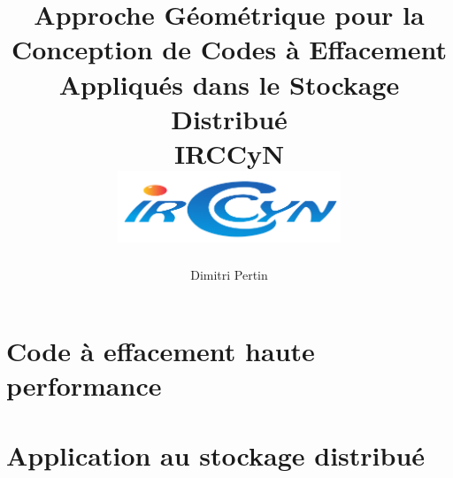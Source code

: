 
\makeindex



\title{
    {Approche Géométrique pour la Conception de Codes à Effacement Appliqués
    dans le Stockage Distribué}\\
    {\large IRCCyN}\\
    {\includegraphics[width=0.5\textwidth]{img/logo_irccyn.pdf}}
}
\author{Dimitri Pertin}
\date {}

\maketitle

\newpage

\tableofcontents

\part{Code à effacement haute performance}







\part{Application au stockage distribué}







\newpage

\printbibliography[
]

\printindex


